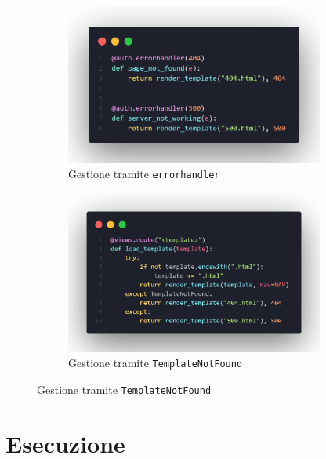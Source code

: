 \documentclass[12pt]{article}
\def\code#1{\texttt{#1}}
\begin{document}
\begin{figure}[h]
    \centering
    \begin{subfigure}{.5\textwidth}
        \includegraphics[width=8.5cm]{errorhandler.png}
        \caption{Gestione tramite \code{errorhandler}}
    \end{subfigure}%
    \begin{subfigure}{.5\textwidth}
        \includegraphics[width=8.5cm]{template-not-found.png}
        \caption{Gestione tramite \code{TemplateNotFound}}
    \end{subfigure}
\end{figure}

\newpage


\section{Esecuzione}
\end{document}

